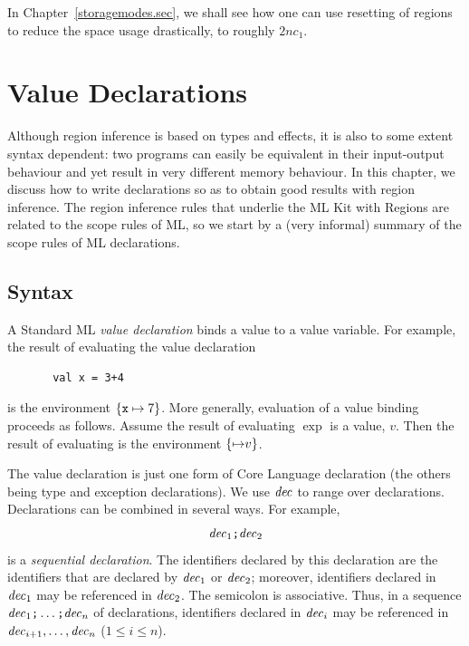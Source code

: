 \documentclass[12pt]{book}
\begin{document}
In Chapter~\ref{storagemodes.sec}, we shall see how one can use resetting of
regions to reduce the space usage drastically, to roughly $2nc_1$.

\chapter{Value Declarations}
\label{valdecl.sec}

Although region inference is based on types and effects, it is also
to some extent syntax dependent: two programs can easily be equivalent
in their input-output behaviour and yet result in very different memory
behaviour. In this chapter, we discuss how to write 
%
declarations so as to obtain good results with region inference. The
region inference rules that underlie the ML Kit with Regions are
related to the scope rules of ML, so we start by a (very informal)
summary of the scope rules of ML declarations.
\section{Syntax}
A Standard ML  {\em value declaration} binds a value 
to a value 
%
variable. For example, the result of evaluating the value declaration
\begin{verbatim}
       val x = 3+4
\end{verbatim}
is the environment $\{\hbox{\tt x}\mapsto 7\}$. More generally,
evaluation of a value binding  proceeds
as follows. Assume the result of evaluating $\exp$ is a value, $v$.
Then the result of evaluating  is the
environment $\{{\it \mapsto} v\}$.

The value declaration is just one form of Core Language declaration 
(the others being type and exception declarations). We use ${\it dec}$ to
range over declarations. Declarations can be
combined in several ways. For example, 
$${\it dec}_1\hbox{\tt ;}{\it dec}_2$$
is a {\em sequential declaration}. The identifiers declared by this
declaration are the identifiers that are declared by ${\it dec}_1$ or ${\it dec}_2$;
moreover, identifiers declared in ${\it dec}_1$ may be referenced in ${\it dec}_2$.
The semicolon is associative. Thus, in a sequence 
${\it dec}_1\hbox{\tt ;}\ldots\hbox{\tt ;}{\it dec}_n$
of declarations, identifiers declared in 
${\it dec}_i$ may be referenced in ${\it dec}_{i+1},\ldots
,{\it dec}_n$ ($1\leq i\leq n$). 
\end{document}
